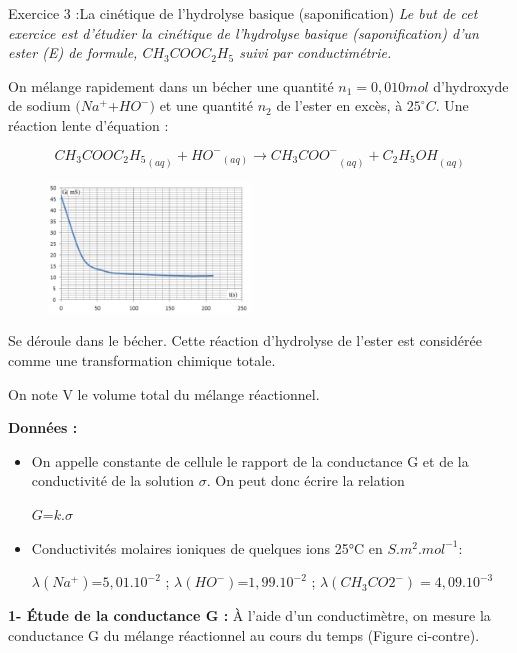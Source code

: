 \documentclass[12pt, french]{article}
\begin{document}
\begin{Box2}{Exercice 3 :La cinétique de l’hydrolyse basique (saponification) }
\emph{Le but de cet exercice est d’étudier la cinétique de l’hydrolyse basique (saponification) d’un ester (E) de
formule, $CH_3COOC_2H_5$ suivi par conductimétrie.}

On mélange rapidement dans un bécher une quantité $n_1 =0,010 mol$ d’hydroxyde de sodium $(Na^+$+$HO^-)$ et une quantité $n_2$ de l’ester en excès, à $25 ^{\circ}C$. Une réaction lente d’équation :

$${CH_3COOC_2H_5}_{(aq)} + {HO^-}_{(aq)} \rightarrow {CH_3COO^-}_{(aq)} +  {C_2H_5OH}_{(aq)}$$


\begin{figure}
  \begin{center}
	\includegraphics[width=0.48\textwidth]{./img/ex03.png}
  \end{center}
\end{figure}

Se déroule dans le bécher. Cette réaction d’hydrolyse de l’ester est considérée comme une transformation
chimique totale. 

On note V le volume total du mélange réactionnel.

\textbf{Données : } 
\begin{itemize}
	\item On appelle constante de cellule le rapport
de la conductance G et de la conductivité de la
solution $\sigma$. On peut donc écrire la relation 

$G$=$ k . \sigma$

\item Conductivités molaires ioniques de quelques ions 25°C en $S.m^2. mol^{ -1}$: 

	$\lambda(Na^+) $=$ 5,01.10^{-2}$ ; $\lambda(HO^-) $=$ 1,99.10^{-2}$ ; $\lambda(CH_3CO2^-)= 4,09.10^{-3}$
\end{itemize}

\textbf{1- Étude de la conductance G : }
À l’aide d’un conductimètre, on mesure la
conductance G du mélange réactionnel au cours du
temps (Figure ci-contre).


\end{Box2}
\end{document}

